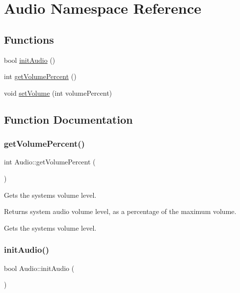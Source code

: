 \hypertarget{namespaceAudio}{}\section{Audio Namespace Reference}
\label{namespaceAudio}
\subsection*{Functions}
\begin{DoxyCompactItemize}
\item 
bool \mbox{\hyperlink{namespaceAudio_a13ee88a6ed5069b4f69d49caece64486}{init\+Audio}} ()
\item 
int \mbox{\hyperlink{namespaceAudio_a5ffcc8e968d995583330812c85cd3265}{get\+Volume\+Percent}} ()
\item 
void \mbox{\hyperlink{namespaceAudio_af70e115ed53babcf2c418cbd1cd50bba}{set\+Volume}} (int volume\+Percent)
\end{DoxyCompactItemize}


\subsection{Function Documentation}
\mbox{\label{namespaceAudio_a5ffcc8e968d995583330812c85cd3265}} 
\subsubsection{\texorpdfstring{get\+Volume\+Percent()}{getVolumePercent()}}
{\footnotesize\ttfamily int Audio\+::get\+Volume\+Percent (\begin{DoxyParamCaption}{ }\end{DoxyParamCaption})}

Gets the system\textquotesingle{}s volume level.

\begin{DoxyReturn}{Returns}
system audio volume level, as a percentage of the maximum volume.
\end{DoxyReturn}
Gets the system\textquotesingle{}s volume level. \mbox{\label{namespaceAudio_a13ee88a6ed5069b4f69d49caece64486}} 
\subsubsection{\texorpdfstring{init\+Audio()}{initAudio()}}
{\footnotesize\ttfamily bool Audio\+::init\+Audio (\begin{DoxyParamCaption}{ }\end{DoxyParamCaption})}

